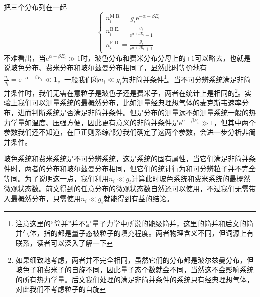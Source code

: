 \documentclass[../../main.tex]{subfiles}
\begin{document}
把三个分布列在一起
\begin{equation}\label{eq:三大最概然分布}
    \begin{cases}
        \displaystyle n_i^{\mathrm{M.B.}}=g_i\mathrm{e}^{-\alpha-\beta E_i} \\
        \displaystyle n_i^{\mathrm{B.E.}}=\frac{g_i}{\mathrm{e}^{\alpha+\beta E_i}-1} \\
        \displaystyle n_i^{\mathrm{F.D.}}=\frac{g_i}{\mathrm{e}^{\alpha+\beta E_i}+1}
    \end{cases}
\end{equation}
不难看出，当\(\mathrm{e}^{\alpha+\beta E_i}\gg1\)时，玻色分布和费米分布分母上的\(\mp1\)可以略去，也就是说玻色分布、费米分布和玻尔兹曼分布相同了，显然此时等价地有\(\displaystyle \frac{n_i}{g_i}=\mathrm{e}^{-\alpha-\beta E_i}\ll 1\)，一般我们称\(n_i\ll g_i\)为非简并条件\footnote{注意这里的“简并”并不是量子力学中所说的能级简并，这里的简并和后文的简并气体，指的都是量子态被粒子的填充程度。两者物理含义不同，但词源上有联系，读者可以深入了解一下}。当不可分辨系统满足非简并条件时，我们无需在意粒子是玻色子还是费米子，两者在统计上是相同的\footnote{如果细致地考虑，两者并不完全相同，虽然它们的分布都是玻尔兹曼分布，但玻色子和费米子的自旋不同，因此量子态个数就会不同，当然这不会影响系统的所有热力学量。后文我们处理的满足非简并条件的系统只有经典理想气体，对此我们不考虑粒子的自旋}。实验上我们可以测量系统的最概然分布，比如测量经典理想气体的麦克斯韦速率分布，进而判断系统是否满足非简并条件。但是分布的测量远不如测量系统一般的热力学量如温度、压强方便，因此更有意义的非简并条件是\(\mathrm{e}^{\alpha+\beta E_i}\gg1\)，但其中两个参数我们还不知道，在巨正则系综部分我们确定了这两个参数，会进一步分析非简并条件。

玻色系统和费米系统是不可分辨系统，这是系统的固有属性，当它们满足非简并条件时，两者的分布和玻尔兹曼分布相同，但它们的统计行为和可分辨粒子并不完全等同。为了说明这一点，我们利用\(n_i\ll g_i\)计算此时玻色系统和费米系统的最概然微观状态数。前文得到的任意分布的微观状态数自然还可以使用，不过我们无需带入最概然分布，只需使用\(n_i\ll g_i\)就能得到有益的结论。
\end{document}

